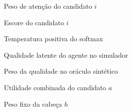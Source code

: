 \documentclass[12pt,openany,oneside,a4paper,brazil,chapter=TITLE]{abntex2}
\begin{document}
\begin{simbolos}
\item[$w_i$] Peso de atenção do candidato $i$
\item[$f_i$] Escore do candidato $i$
\item[$\tau$] Temperatura positiva do softmax
\item[$q$] Qualidade latente do agente no simulador
\item[$q_w$] Peso da qualidade no oráculo sintético
\item[$u(a)$] Utilidade combinada do candidato $a$
\item[$\alpha_h$] Peso fixo da cabeça $h$
\end{simbolos}
\tableofcontents*
\clearpage
\textual
\pagestyle{abntsubmissao}
\hypersetup{pageanchor=true}


















\postextual
\begin{SingleSpacing}
\raggedright

\end{SingleSpacing}


\end{document}
